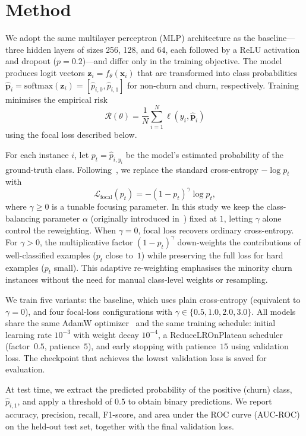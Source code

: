 \documentclass[11pt,a4paper]{article}
\begin{document}
\section{Method}
\label{sec:method}

We adopt the same multilayer perceptron (MLP) architecture as the baseline---three hidden layers of sizes 256, 128, and 64, each followed by a ReLU activation and dropout ($p=0.2$)---and differ only in the training objective. The model produces logit vectors $\mathbf{z}_i = f_\theta(\mathbf{x}_i)$ that are transformed into class probabilities $\hat{\mathbf{p}}_i = \text{softmax}(\mathbf{z}_i) = [\hat{p}_{i,0},\hat{p}_{i,1}]$ for non-churn and churn, respectively. Training minimises the empirical risk
\[
\mathcal{R}(\theta) = \frac{1}{N}\sum_{i=1}^{N} \ell(y_i,\hat{\mathbf{p}}_i)
\]
using the focal loss described below.

For each instance $i$, let $p_t = \hat{p}_{i,y_i}$ be the model’s estimated probability of the ground-truth class. Following~\citet{lin2017focal}, we replace the standard cross-entropy $-\log p_t$ with
\[
\mathcal{L}_{\text{focal}}(p_t) = - (1-p_t)^\gamma \log p_t,
\]
where $\gamma \ge 0$ is a tunable focusing parameter. In this study we keep the class-balancing parameter $\alpha$ (originally introduced in~\cite{lin2017focal}) fixed at $1$, letting $\gamma$ alone control the reweighting. When $\gamma = 0$, focal loss recovers ordinary cross-entropy. For $\gamma>0$, the multiplicative factor $(1-p_t)^\gamma$ down-weights the contributions of well-classified examples ($p_t$ close to~$1$) while preserving the full loss for hard examples ($p_t$ small). This adaptive re-weighting emphasises the minority churn instances without the need for manual class-level weights or resampling.

We train five variants: the baseline, which uses plain cross-entropy (equivalent to $\gamma=0$), and four focal-loss configurations with $\gamma \in \{0.5, 1.0, 2.0, 3.0\}$. All models share the same AdamW optimizer~\cite{kingma2014adam} and the same training schedule: initial learning rate $10^{-3}$ with weight decay $10^{-4}$, a ReduceLROnPlateau scheduler (factor~$0.5$, patience~$5$), and early stopping with patience~$15$ using validation loss. The checkpoint that achieves the lowest validation loss is saved for evaluation.

At test time, we extract the predicted probability of the positive (churn) class, $\hat{p}_{i,1}$, and apply a threshold of $0.5$ to obtain binary predictions. We report accuracy, precision, recall, F1-score, and area under the ROC curve (AUC-ROC) on the held-out test set, together with the final validation loss.
\end{document}
